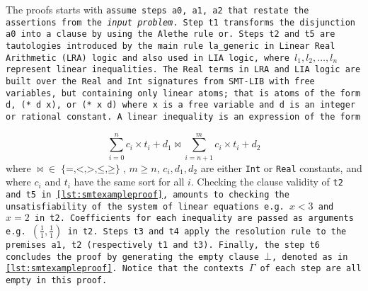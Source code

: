 The proofs starts with \tt{assume} steps \tt{a0}, \tt{a1}, \tt{a2} that restate the assertions from the \emph{input problem}. %
Step \tt{t1} transforms the disjunction \texttt{a0} into a clause by using the Alethe rule \tt{or}.
Steps \tt{t2} and \tt{t5} are tautologies introduced by the main rule \tt{la\_generic}
in Linear Real Arithmetic (LRA) logic and also used in LIA logic, where \colorbox{green!30}{$l_1, l_2,\dots, l_n$} represent linear inequalities.
The \lstinline[language=SMT,basicstyle=\ttfamily\footnotesize]{Real} terms in LRA and LIA logic are built over the \lstinline[language=SMT,basicstyle=\ttfamily\footnotesize]{Real} and \lstinline[language=SMT,basicstyle=\ttfamily\footnotesize]{Int} signatures from SMT-LIB with free variables, but containing only linear atoms; that is
atoms of the form \lstinline[language=SMT,basicstyle=\ttfamily\footnotesize]{d}, \lstinline[language=SMT,basicstyle=\ttfamily\footnotesize]{(* d x)}, or \lstinline[language=SMT,basicstyle=\ttfamily\footnotesize]{(* x d)}  where \lstinline[language=SMT,basicstyle=\ttfamily\footnotesize]{x} is a free variable and  \lstinline[language=SMT,basicstyle=\ttfamily\footnotesize]{d} is an integer or rational constant.
A linear inequality is an expression of the form

\begin{equation}
\sum_{i=0}^{n}c_i\times{}t_i + d_1\bowtie \sum_{i=n+1}^{m} c_i\times{}t_i + d_2
\label{eqn:inequality}
\end{equation}
%
where $\mathop{\bowtie} \mathrel{\in} \mathop{\{=, <, >, \leq, \geq\}}$, $m\geq n$, $c_i, d_1, d_2$ are either \lstinline[language=SMT,basicstyle=\ttfamily\footnotesize]{Int} or \lstinline[language=SMT,basicstyle=\ttfamily\footnotesize]{Real}
constants, and where $c_i$ and $t_i$ have the same sort for all $i$.
Checking the clause validity of \tt{t2} and \tt{t5} in \cref{lst:smtexampleproof}, amounts to checking the unsatisfiability of the system of linear equations e.g. $x < 3$ and $x = 2$ in \tt{t2}.
Coefficients for each inequality are passed as arguments e.g. $(\frac{1}{1},\frac{1}{1})$ in \tt{t2}.
Steps \tt{t3} and \tt{t4} apply the \colorbox{purple!30}{\texttt{resolution}} rule to the premises \tt{a1}, \tt{t2} (respectively \tt{t1} and \tt{t3}).
Finally, the step \texttt{t6} concludes the proof by generating the empty clause $\bot$, denoted as  in \cref{lst:smtexampleproof}.
Notice that the contexts \colorbox{blue!30}{$\Gamma$} of each step are all empty in this proof.

